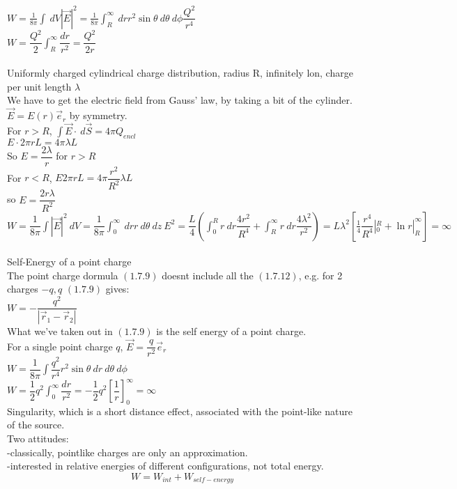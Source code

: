 \documentclass[a4paper,11pt]{article}
\begin{document}
$W=\frac{1}{8\pi}\int~dV |\vec{E}|^2=\frac{1}{8\pi}\int^\infty _R ~dr r^2\sin\theta~d\theta~d\phi\dfrac{Q^2}{r^4}$\\
$W=\dfrac{Q^2}{2}\int ^\infty_R \dfrac{dr}{r^2}=\dfrac{Q^2}{2r}$\\
\\
Uniformly charged cylindrical charge distribution, radius R, infinitely lon, charge per unit length $\lambda$\\
We have to get the electric field from Gauss' law, by taking a bit of the cylinder.\\
$\vec{E}=E(r)\vec{e}_r$ by symmetry.\\
For $r>R$, $\int\vec{E}\cdot~d\vec{S}=4\pi Q_{encl}$\\
$E\cdot2\pi r L=4\pi\lambda L$\\
So $E=\dfrac{2\lambda}{r}$ for $r>R$\\
For $r<R$, $E2\pi rL=4\pi \dfrac{r^2}{R^2}\lambda L$\\
so $E=\dfrac{2r\lambda}{R^2}$\\
$W=\dfrac{1}{8\pi}\int |\vec{E}|^2~dV=\dfrac{1}{8\pi}\int^\infty _0 ~dr r~d\theta~dz ~E^2=\dfrac{L}{4}(\int^R_0r~dr\dfrac{4r^2}{R^4}+\int_R^\infty r~dr\dfrac{4\lambda^2}{r^2})=L\lambda^2[\frac{1}{4}\dfrac{r^4}{R^4}|^R _0 +\ln r|^\infty _R]=\infty$\\
\\
Self-Energy of a point charge\\
The point charge dormula $(1.7.9)$ doesnt include all the $(1.7.12)$, e.g. for 2 charges $-q,q$ $(1.7.9)$ gives:\\
$W=-\dfrac{q^2}{|\vec{r}_1-\vec{r}_2|}$\\
What we've taken out in $(1.7.9)$ is the self energy of a point charge.\\
For a single point charge $q$,
$\vec{E}=\dfrac{q}{r^2}\vec{e}_r$\\
$W=\dfrac{1}{8\pi}\int \dfrac{q^2}{r^4}r^2 \sin\theta~dr~d\theta~d\phi$\\
$W=\dfrac{1}{2}q^2\int^\infty _0 \dfrac{dr}{r^2}=-\dfrac{1}{2}q^2\left[\dfrac{1}{r}\right]^\infty _0=\infty$\\
Singularity, which is a short distance effect, associated with the point-like nature of the source.\\
Two attitudes:\\
-classically, pointlike charges are only an approximation.\\
-interested in relative energies of different configurations, not total energy.
$$W=W_{int}+W_{self-energy}$$
\end{document}
